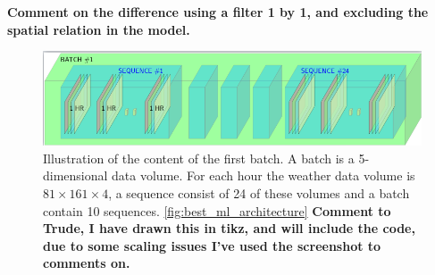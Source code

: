 \begin{table}[]
    \centering
    \caption{Results, metrics and number of parameters for the trained models. The best model \acrshort{convlstm}-model is highlighted in light blue.}
    \label{tab:convlstmLoss}
\end{table}

\textbf{Comment on the difference using a filter 1 by 1, and excluding the spatial relation in the model.}

\begin{figure}
    \centering
    \includegraphics[scale=0.6]{ChapterX_Results_and_Conclusion/computational_experiments/temp_input_volume.png}
    \caption{Illustration of the content of the first batch. A batch is a 5-dimensional data volume. For each hour the weather data volume is $81\times 161\times 4$, a sequence consist of 24 of these volumes and a batch contain 10 sequences. \ref{fig:best_ml_architecture} \textbf{Comment to Trude, I have drawn this in tikz, and will include the code, due to some scaling issues I've used the screenshot to comments on.}}
    \label{fig:input_volume_conv_lstm}
\end{figure}

